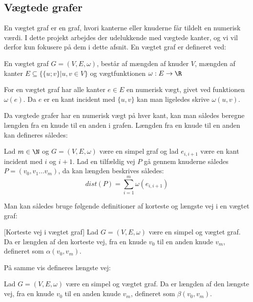 \subsection{Vægtede grafer}
En vægtet graf er en graf, hvori kanterne eller knuderne får tildelt en numerisk værdi. I dette projekt arbejdes der udelukkende med vægtede kanter, og vi vil derfor kun fokusere på dem i dette afsnit.
En vægtet graf er defineret ved:
\begin{defn}
En vægtet graf $G=(V,E, \omega)$, består af mængden af knuder $V$, mængden af kanter $E \subseteq \{\{u;v\}|u,v \in V\}$ og vægtfunktionen $\omega: E \rightarrow \R$
\end{defn}


For en vægtet graf har alle kanter $e\in E$ en numerisk vægt, givet ved funktionen $\omega (e)$. Da $e$ er en kant incident med $\{u,v\}$ kan man  ligeledes skrive $\omega (u,v)$.


Da vægtede grafer har en numerisk vægt på hver kant, kan man således beregne længden fra en knude til en anden i grafen. Længden fra en knude til en anden kan defineres således:

\begin{defn}
Lad $m\in \N $ og $G=(V,E,\omega)$ være en simpel graf og lad $e_{i,i+1}$ være en kant incident med $i$ og $i+1$. Lad en tilfældig vej $P$ gå gennem knuderne således $P=(v_0,v_1...v_m)$, da kan længden beskrives således:
	\begin{equation*}
	dist(P)=\sum_{i=1}^{m}\omega(e_{i,i+1})
	\end{equation*}  
\end{defn}

Man kan således bruge følgende definitioner af korteste og længste vej i en vægtet graf:


\begin{defn} \label{defn:min.vej} [Korteste vej i vægtet graf]
Lad $G=(V,E,\omega)$ være en simpel og vægtet graf. Da er længden af den korteste vej, fra en knude $v_0$ til en anden knude $v_m$, defineret som $\alpha(v_0,v_m)$.
\end{defn}

På samme vis defineres længste vej:

\begin{defn} 
Lad $G=(V,E,\omega)$ være en simpel og vægtet graf. Da er længden af den længste vej, fra en knude $v_0$ til en anden knude $v_m$, defineret som $\beta(v_0,v_m)$.
\end{defn}

